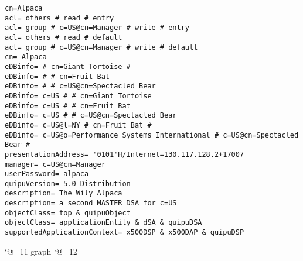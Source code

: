 
\smaller
\begin{verbatim}
cn=Alpaca
acl= others # read # entry
acl= group # c=US@cn=Manager # write # entry
acl= others # read # default
acl= group # c=US@cn=Manager # write # default
cn= Alpaca
eDBinfo= # cn=Giant Tortoise #
eDBinfo= # # cn=Fruit Bat
eDBinfo= # # c=US@cn=Spectacled Bear
eDBinfo= c=US # # cn=Giant Tortoise
eDBinfo= c=US # # cn=Fruit Bat
eDBinfo= c=US # # c=US@cn=Spectacled Bear
eDBinfo= c=US@l=NY # cn=Fruit Bat #
eDBinfo= c=US@o=Performance Systems International # c=US@cn=Spectacled Bear #
presentationAddress= '0101'H/Internet=130.117.128.2+17007
manager= c=US@cn=Manager
userPassword= alpaca
quipuVersion= 5.0 Distribution
description= The Wily Alpaca
description= a second MASTER DSA for c=US
objectClass= top & quipuObject
objectClass= applicationEntity & dSA & quipuDSA
supportedApplicationContext= x500DSP & x500DAP & quipuDSP

\end{verbatim}

\catcode`@=11
\expandafter\ifx\csname graph\endcsname\relax {}\box\chardef\insc@unt\graph\fi
\catcode`@=12
\setbox\graph=\empty

